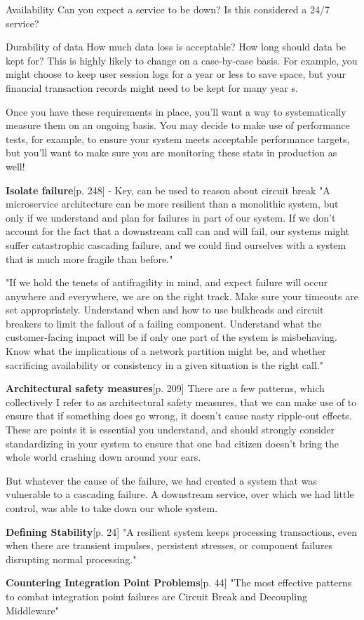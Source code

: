 {Availability
	Can you expect a service to be down? Is this considered a 24/7 service?


Durability of data
	How much data loss is acceptable? How long should data be kept for? This is highly likely to change on a case-by-case basis. For example, you might choose to keep user session logs for a year or less to save space, but your financial transaction records might need to be kept for many year s.
	
	
Once you have these requirements in place, you’ll want a way to systematically measure them on an ongoing basis. You may decide to make use of performance tests, for example, to ensure your system meets acceptable performance targets, but you’ll want to make sure you are monitoring these stats in production as well!


\textbf{Isolate failure}\cite{newman2015microservices}[p. 248]  - Key, can be used to reason about circuit break
"A microservice architecture can be more resilient than a monolithic system, but only if we understand and plan for failures in part of our system. If we don’t account for the fact that a downstream call can and will fail, our systems might suffer catastrophic cascading failure, and we could find ourselves with a system that is much more fragile than before."


"If we hold the tenets of antifragility in mind, and expect failure will occur anywhere and everywhere, we are on the right track. Make sure your timeouts are set appropriately. Understand when and how to use bulkheads and circuit breakers to limit the fallout of a failing component. Understand what the customer-facing impact will be if only one part of the system is misbehaving. Know what the implications of a network partition might be, and whether sacrificing availability or consistency in a given situation is the right call."

\textbf{Architectural safety measures}\cite{newman2015microservices}[p. 209]
There are a few patterns, which collectively I refer to as architectural safety measures, that we can make use of to ensure that if something does go wrong, it doesn’t cause nasty ripple-out effects. These are points it is essential you understand, and should strongly consider standardizing in your system to ensure that one bad citizen doesn’t bring the whole world crashing down around your ears.


But whatever the cause of the failure, we had created a system that was vulnerable to a cascading failure. A downstream service, over which we had little control, was able to take down our whole system.


\textbf{Defining Stability}\cite{nygard2007release}[p. 24]
"A resilient system keeps processing transactions, even when there are transient impulses, persistent stresses, or component failures disrupting normal processing."

\textbf{Countering Integration Point Problems}\cite{nygard2007release}[p. 44]
"The most effective patterns to combat integration point failures are Circuit Break and Decoupling Middleware"
}